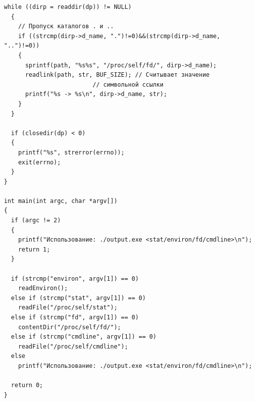 \documentclass[a4paper,14pt]{extreport} %
\begin{document}
\begin{lstlisting}[caption=Часть 1. ]
  while ((dirp = readdir(dp)) != NULL)
  {
    // Пропуск каталогов . и ..
    if ((strcmp(dirp->d_name, ".")!=0)&&(strcmp(dirp->d_name, "..")!=0))
    {
      sprintf(path, "%s%s", "/proc/self/fd/", dirp->d_name);
      readlink(path, str, BUF_SIZE); // Считывает значение 
      				     // символьной ссылки
      printf("%s -> %s\n", dirp->d_name, str);
    }
  }
   
  if (closedir(dp) < 0)
  {
    printf("%s", strerror(errno));
    exit(errno);
  }
}

int main(int argc, char *argv[])
{
  if (argc != 2)
  {
    printf("Использование: ./output.exe <stat/environ/fd/cmdline>\n");
    return 1;
  }

  if (strcmp("environ", argv[1]) == 0)
    readEnviron();
  else if (strcmp("stat", argv[1]) == 0)
    readFile("/proc/self/stat");
  else if (strcmp("fd", argv[1]) == 0)
    contentDir("/proc/self/fd/");
  else if (strcmp("cmdline", argv[1]) == 0)
    readFile("/proc/self/cmdline");
  else
    printf("Использование: ./output.exe <stat/environ/fd/cmdline>\n");

  return 0;
}
\end{lstlisting}
\end{document}
